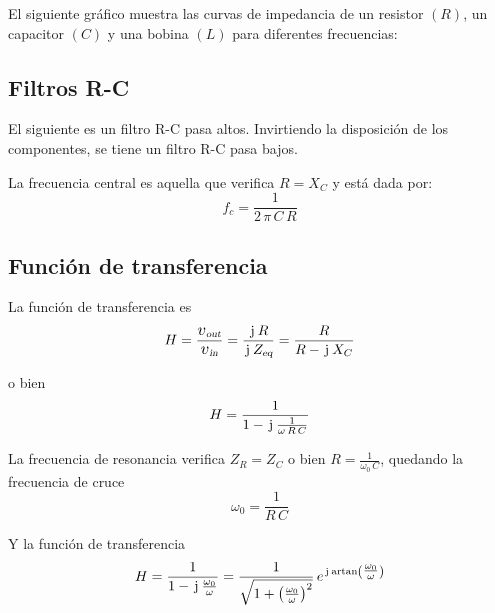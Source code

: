\documentclass[a5paper,12pt,twoside]{book}
\begin{document}
El siguiente gráfico muestra las curvas de impedancia de un resistor $(R)$, un capacitor $(C)$ y una bobina $(L)$ para diferentes frecuencias:

\begin{center}
    \def\svgwidth{0.7\linewidth}
    
\end{center}


\subsection{Filtros R-C}

El siguiente es un filtro R-C pasa altos.
Invirtiendo la disposición de los componentes, se tiene un filtro R-C pasa bajos.

\begin{center}
    \def\svgwidth{0.6\linewidth}
    
\end{center}

La frecuencia central es aquella que verifica $R = X_C$ y está dada por:
\begin{equation*}
    f_c = \frac{1}{2 \, \pi \, C \, R}
\end{equation*}


\subsection{Función de transferencia}

La función de transferencia es
\begin{equation*}
    H = \frac{\sub{\voltage}{out}}{\sub{\voltage}{in}}
    = \frac{\iu \, R}{\iu \, \sub{Z}{eq}}
    = \frac{R}{R - \iu \, X_C}
\end{equation*}

o bien
\begin{equation*}
    H = \frac{1}{1 - \hspace{0.5mm}\mathrm{j}\mkern1mu \, \tfrac{1}{\omega \, R \, C}}
\end{equation*}

La frecuencia de resonancia verifica $Z_R = Z_C$ o bien $R = \frac{1}{\omega_0 \, C}$, quedando la frecuencia de cruce
\begin{equation*}
    \omega_0 = \frac{1}{R \, C}
\end{equation*}

Y la función de transferencia
\begin{equation*}
    H = \frac{1}{1 - \hspace{0.5mm}\mathrm{j}\mkern1mu \, \tfrac{\omega_0}{\omega}} = \frac{1}{\sqrt{1 +  \left(\tfrac{\omega_0}{\omega}\right)^2}} \, e^{\hspace{0.5mm}\mathrm{j}\mkern1mu \operatorname{artan} \left(\tfrac{\omega_0}{\omega}\right)}
\end{equation*}
\end{document}
